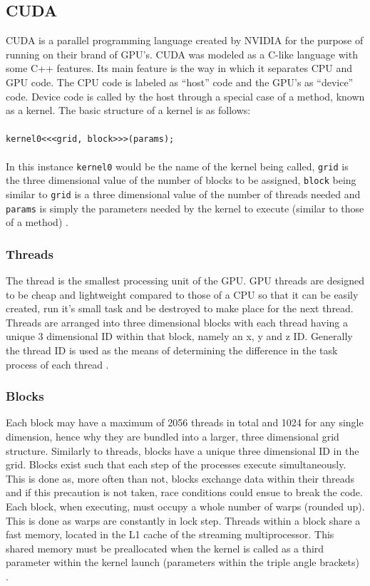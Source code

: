 \subsection{CUDA}\label{gpu:sec:cuda}
CUDA is a parallel programming language created by NVIDIA for the purpose of running on their brand of GPU's. CUDA was modeled as a C-like language with some C++ features. Its main feature is the way in which it separates CPU and GPU code. The CPU code is labeled as ``host'' code and the GPU's as ``device'' code. Device code is called by the host through a special case of a method, known as a kernel. The basic structure of a kernel is as follows: 
\\
\\
\texttt{kernel0<<<grid, block>>>(params);}
\\
\\
In this instance \texttt{kernel0} would be the name of the kernel being called, \texttt{grid} is the three dimensional value of the number of blocks to be assigned, \texttt{block} being similar to \texttt{grid} is a three dimensional value of the number of threads needed and \texttt{params} is simply the parameters needed by the kernel to execute (similar to those of a method) \citep{CUDA_DEVKIT}.
%
\subsubsection{Threads}\label{gpu:ssec:thread}
The thread is the smallest processing unit of the GPU. GPU threads are designed to be cheap and lightweight compared to those of a CPU so that it can be easily created, run it's small task and be destroyed to make place for the next thread. Threads are arranged into three dimensional blocks with each thread having a unique 3 dimensional ID within that block, namely an x, y and z ID. Generally the thread ID is used as the means of determining the difference in the task process of each thread \citep{CUDA_DEVKIT}.
%
\subsubsection{Blocks}\label{gpu:ssec:block}
Each block may have a maximum of 2056 threads in total and 1024 for any single dimension, hence why they are bundled into a larger, three dimensional grid structure. Similarly to threads, blocks have a unique three dimensional ID in the grid. Blocks exist such that each step of the processes execute simultaneously. This is done as, more often than not, blocks exchange data within their threads and if this precaution is not taken, race conditions could ensue to break the code. Each block, when executing, must occupy a whole number of warps (rounded up). This is done as warps are constantly in lock step. Threads within a block share a fast memory, located in the L1 cache of the streaming multiprocessor. This shared memory must be preallocated when the kernel is called as a third parameter within the kernel launch (parameters within the triple angle brackets) \citep{CUDA_DEVKIT}.
%
